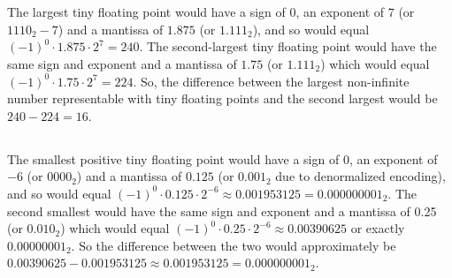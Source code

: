 \documentclass{article}
\begin{document}
\section{}
\subsection{}
The largest tiny floating point would have a sign of \(0\), an exponent of \(7\) (or \(1110_2 - 7\)) and a mantissa of \(1.875\) (or \(1.111_2\)), and so would equal \((-1)^{0} \cdot 1.875 \cdot 2^{7} = 240\). The second-largest tiny floating point would have the same sign and exponent and a mantissa of \(1.75\) (or \(1.111_2\)) which would equal \((-1)^0 \cdot 1.75 \cdot 2^{7} = 224\). So, the difference between the largest non-infinite number representable with tiny floating points and the second largest would be \(240-224=16\).
\subsection{}
The smallest positive tiny floating point would have a sign of \(0\), an exponent of \(-6\) (or \(0000_2\)) and a mantissa of \(0.125\) (or \(0.001_2\) due to denormalized encoding), and so would equal \((-1)^{0} \cdot 0.125 \cdot 2^{-6} \approx 0.001953125 = 0.000000001_2\). The second smallest would have the same sign and exponent and a mantissa of 0.25 (or \(0.010_2\)) which would equal \((-1)^{0} \cdot 0.25 \cdot 2^{-6} \approx 0.00390625\) or exactly \(0.00000001_2\). So the difference between the two would approximately be \( 0.00390625 - 0.001953125 \approx 0.001953125 = 0.000000001_2 \).
\end{document}
